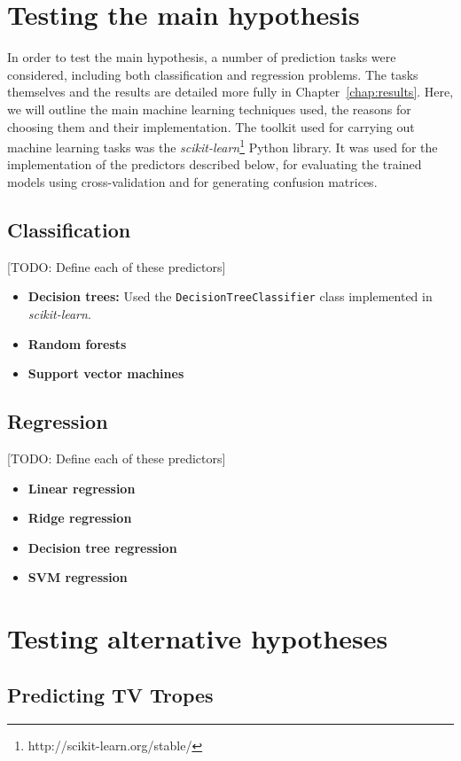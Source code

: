 \documentclass[bsc,frontabs,singlespacing,parskip]{infthesis} %
\begin{document}
\section{Testing the main hypothesis}
\label{sec:predictors}
In order to test the main hypothesis, a number of prediction tasks were considered, including both classification and regression problems. The tasks themselves and the results are detailed more fully in Chapter~\ref{chap:results}. Here, we will outline the main machine learning techniques used, the reasons for choosing them and their implementation. The toolkit used for carrying out machine learning tasks was the \textit{scikit-learn}\footnote{http://scikit-learn.org/stable/} Python library. It was used for the implementation of the predictors described below, for evaluating the trained models using cross-validation and for generating confusion matrices.

\subsection{Classification}
[TODO: Define each of these predictors]
\begin{itemize}
	\item \textbf{Decision trees:} Used the \texttt{DecisionTreeClassifier} class implemented in \textit{scikit-learn}.
	\item \textbf{Random forests}
	\item \textbf{Support vector machines}
\end{itemize}


\subsection{Regression}
[TODO: Define each of these predictors]
\begin{itemize}
	\item \textbf{Linear regression}
	\item \textbf{Ridge regression}
	\item \textbf{Decision tree regression}
	\item \textbf{SVM regression}
\end{itemize}

\section{Testing alternative hypotheses}

\subsection{Predicting TV Tropes}
\end{document}
